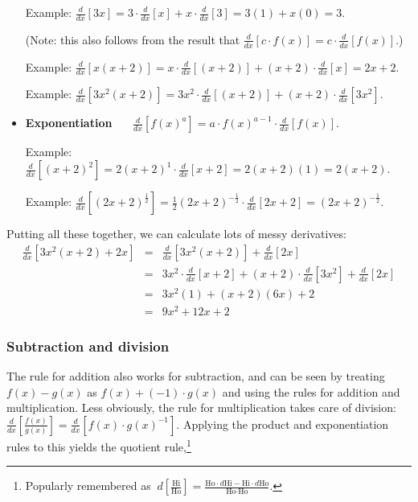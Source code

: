 \begin{CALCULUS}
\begin{itemize}
\medskip

Example: $\displaystyle \frac{d}{dx} \left[ 3x \right]  =  3\cdot
\frac{d}{dx} \left[ x \right] + x \cdot \frac{d}{dx} \left[ 3
\right] = 3(1) + x(0) = 3.$

(Note: this also follows from the result that $\displaystyle
\frac{d}{dx}[c\cdot f(x)] = c\cdot \frac{d}{dx}[ f(x)]$.)

Example: $\displaystyle \frac{d}{dx} \left[ x(x+2) \right]  =
x\cdot \frac{d}{dx} \left[ (x+2) \right] + (x+2) \cdot
\frac{d}{dx} \left[ x \right] = 2x+2.$

Example: $\displaystyle \frac{d}{dx} \left[ 3x^2(x+2) \right]  =
3x^2\cdot \frac{d}{dx} \left[ (x+2) \right] + (x+2) \cdot
\frac{d}{dx} \left[ 3x^2 \right].$

\medskip

\item \textbf{Exponentiation} \ \ \  $\displaystyle
\frac{d}{dx}\left[ f(x)^a \right]  =  a\cdot f(x)^{a-1} \cdot
\frac{d}{dx}\left[f(x)\right].$

\medskip

Example: $\displaystyle \frac{d}{dx}\left[ (x+2)^2 \right]  =
2(x+2)^1\cdot \frac{d}{dx}\left[x+2 \right] = 2(x+2)(1) = 2(x+2).$

Example: $\displaystyle \frac{d}{dx}\left[ (2x+2)^{\frac{1}{2}}
\right]  =  \frac{1}{2}(2x+2)^{-\frac{1}{2}}\cdot
\frac{d}{dx}\left[2x+2 \right] = (2x+2)^{-\frac{1}{2}}.$

\medskip

\end{itemize}

\noindent Putting all these together, we can calculate lots of messy derivatives:
\begin{eqnarray*}
\frac{d}{dx} \left[ 3x^2(x+2) + 2x \right]  & = & \frac{d}{dx} \left[ 3x^2(x+2) \right] + \frac{d}{dx} \left[ 2x \right]\\
& = & 3x^2\cdot \frac{d}{dx} \left[ x+2\right] + (x+2) \cdot \frac{d}{dx} \left[ 3x^2 \right] + \frac{d}{dx} \left[ 2x \right]\\
& = & 3x^2(1) + (x+2)(6x) + 2\\
& = & 9x^2+12x+2
\end{eqnarray*}


\subsubsection*{Subtraction and division}

The rule for addition also works for subtraction, and can be seen by treating $f(x)-g(x)$ as $f(x)+ (-1)\cdot g(x)$ and using the rules for addition and multiplication. Less obviously, the rule for multiplication takes care of division: $\displaystyle \frac{d}{dx} \left[ \frac{f(x)}{g(x)} \right] = \frac{d}{dx} \left[ f(x)\cdot g(x)^{-1} \right]$. Applying the product and exponentiation rules to this yields the quotient rule,\footnote{Popularly remembered as  $\displaystyle \ d \left[\frac{\mbox{Hi}}{\mbox{Ho}} \right] = \frac{\mbox{Ho}\cdot d\mbox{Hi} - \mbox{Hi}\cdot d\mbox{Ho}}{\mbox{Ho}\cdot\mbox{Ho}}.$}
%
\begin{itemize}


\end{itemize}
\end{CALCULUS}
